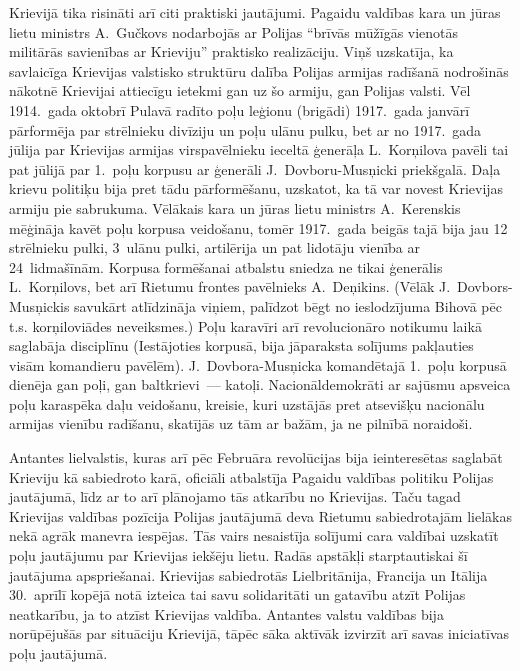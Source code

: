 \documentclass[twoside,a5paper,12pt,fleqn,openany]{extbook}
\begin{document}
Krievijā tika risināti arī citi praktiski jautājumi. Pagaidu valdības kara un jūras lietu ministrs A.~Gučkovs nodarbojās ar Polijas ``brīvās mūžīgās vienotās militārās savienības ar Krieviju'' praktisko realizāciju. Viņš uzskatīja, ka savlaicīga Krievijas valstisko struktūru dalība Polijas armijas radīšanā nodrošinās nākotnē Krievijai attiecīgu ietekmi gan uz šo armiju, gan Polijas valsti. Vēl 1914.~gada oktobrī Pulavā radīto poļu leģionu (brigādi) 1917.~gada janvārī pārformēja par strēlnieku divīziju un poļu ulānu pulku, bet ar no 1917.~gada jūlija par Krievijas armijas virspavēlnieku ieceltā ģenerāļa L.~Korņilova pavēli tai pat jūlijā par 1.~poļu korpusu ar ģenerāli J.~Dovboru-Musņicki priekšgalā. Daļa krievu politiķu bija pret tādu pārformēšanu, uzskatot, ka tā var novest Krievijas armiju pie sabrukuma. Vēlākais kara un jūras lietu ministrs A.~Kerenskis mēģināja kavēt poļu korpusa veidošanu, tomēr 1917.~gada beigās tajā bija jau 12 strēlnieku pulki, 3~ulānu pulki, artilērija un pat lidotāju vienība ar 24~lidmašīnām. Korpusa formēšanai atbalstu sniedza ne tikai ģenerālis L.~Korņilovs, bet arī Rietumu frontes pavēlnieks A.~Deņikins. (Vēlāk J.~Dovbors-Musņickis savukārt atlīdzināja viņiem, palīdzot bēgt no ieslodzījuma Bihovā pēc t.s. korņiloviādes neveiksmes.) Poļu karavīri arī revolucionāro notikumu laikā saglabāja disciplīnu (Iestājoties korpusā, bija jāparaksta solījums pakļauties visām komandieru pavēlēm). J.~Dovbora-Musņicka komandētajā 1.~poļu korpusā dienēja gan poļi, gan baltkrievi~--- katoļi. Nacionāldemokrāti ar sajūsmu apsveica poļu karaspēka daļu veidošanu, kreisie, kuri uzstājās pret atsevišķu nacionālu armijas vienību radīšanu, skatījās uz tām ar bažām, ja ne pilnībā noraidoši.

Antantes lielvalstis, kuras arī pēc Februāra revolūcijas bija ieinteresētas saglabāt Krieviju kā sabiedroto karā, oficiāli atbalstīja Pagaidu valdības politiku Polijas jautājumā, līdz ar to arī plānojamo tās atkarību no Krievijas. Taču tagad Krievijas valdības pozīcija Polijas jautājumā deva Rietumu sabiedrotajām lielākas nekā agrāk manevra iespējas. Tās vairs nesaistīja solījumi cara valdībai uzskatīt poļu jautājumu par Krievijas iekšēju lietu. Radās apstākļi starptautiskai šī jautājuma apspriešanai. Krievijas sabiedrotās Lielbritānija, Francija un Itālija 30.~aprīlī kopējā notā izteica tai savu solidaritāti un gatavību atzīt Polijas neatkarību, ja to atzīst Krievijas valdība. Antantes valstu valdības bija norūpējušās par situāciju Krievijā, tāpēc sāka aktīvāk izvirzīt arī savas iniciatīvas poļu jautājumā.
\end{document}
